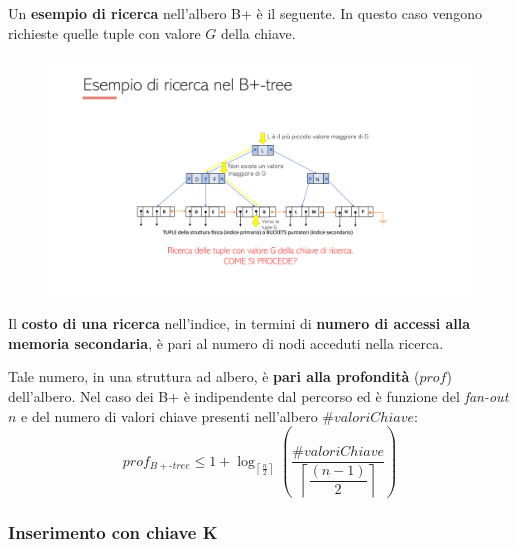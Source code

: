\documentclass[a4paper]{article}
\begin{document}
	\noindent
	Un \textcolor{Green4}{\textbf{esempio di ricerca}} nell'albero B+ è il seguente. In questo caso vengono richieste quelle tuple con valore $G$ della chiave.
	\begin{figure}[!htp]
		\centering
		\includegraphics[width=\textwidth]{img/ricerca-4.pdf}
	\end{figure}
	
	\noindent
	Il \textcolor{Red3}{\textbf{costo di una ricerca}} nell'indice, in termini di \textbf{numero di accessi alla memoria secondaria}, è pari al numero di nodi acceduti nella ricerca.\newline
	
	\noindent
	Tale numero, in una struttura ad albero, è \textbf{pari alla profondità} ($prof$) dell'albero. Nel caso dei B+ è indipendente dal percorso ed è funzione del \emph{fan-out} $n$ e del numero di valori chiave presenti nell'albero $\#valoriChiave$:
	\begin{equation*}
		prof_{B+\text{-}tree} \le 1 + \log_{\left\lceil \frac{n}{2} \right\rceil} \left(\dfrac{\#valoriChiave}{\left\lceil \dfrac{\left(n-1\right)}{2} \right\rceil}\right)
	\end{equation*}\newpage

	\subsubsection{Inserimento con chiave K}
	
\end{document}

